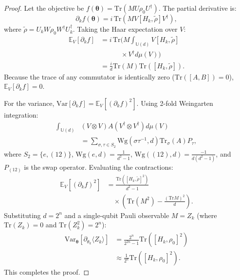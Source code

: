 \documentclass[pdflatex,sn-mathphys-num]{sn-jnl}%
\theoremstyle{thmstyleone}%
\theoremstyle{thmstyletwo}%
\theoremstyle{thmstylethree}%
\begin{document}
\begin{proof}
Let the objective be $f(\boldsymbol{\theta}) = \mathrm{Tr}(M U \rho_0 U^\dagger)$. The partial derivative is:
\begin{equation}
\partial_k f(\boldsymbol{\theta}) = i \, \mathrm{Tr}\left( M V [H_k, \tilde{\rho}] V^\dagger \right),
\end{equation}
where $\tilde{\rho} = U_k W \rho_0 W^\dagger U_k^\dagger$. Taking the Haar expectation over $V$:
\begin{align}
\mathbb{E}_V [\partial_k f] &= i \, \mathrm{Tr}\bigg( M \int_{\mathbb{U}(d)} V [H_k, \tilde{\rho}] \nonumber \\
&\qquad\quad \times V^\dagger d\mu(V) \bigg) \nonumber \\
&= \frac{i}{d} \mathrm{Tr}(M) \mathrm{Tr}([H_k, \tilde{\rho}]).
\label{eq:haar_expectation_zero}
\end{align}
Because the trace of any commutator is identically zero ($\mathrm{Tr}([A, B]) = 0$), $\mathbb{E}_V [\partial_k f] = 0$.

For the variance, $\mathrm{Var}[\partial_k f] = \mathbb{E}_V [(\partial_k f)^2]$. Using 2-fold Weingarten integration:
\begin{align}
\int_{\mathbb{U}(d)} &(V \otimes V) A (V^\dagger \otimes V^\dagger) d\mu(V) \nonumber \\
&= \sum_{\sigma, \tau \in S_2} \mathrm{Wg}(\sigma\tau^{-1}, d) \mathrm{Tr}_\sigma(A) P_\tau,
\label{eq:weingarten_formula}
\end{align}
where $S_2 = \{e, (12)\}$, $\mathrm{Wg}(e, d) = \frac{1}{d^2 - 1}$, $\mathrm{Wg}((12), d) = \frac{-1}{d(d^2 - 1)}$, and $P_{(12)}$ is the swap operator. Evaluating the contractions:
\begin{align}
\mathbb{E}_V [(\partial_k f)^2] &= \frac{\mathrm{Tr}\left([H_k, \tilde{\rho}]^2\right)}{d^2 - 1} \nonumber \\
&\quad \times \left( \mathrm{Tr}(M^2) - \frac{(\mathrm{Tr} M)^2}{d} \right).
\end{align}
Substituting $d = 2^n$ and a single-qubit Pauli observable $M = Z_k$ (where $\mathrm{Tr}(Z_k) = 0$ and $\mathrm{Tr}(Z_k^2) = 2^n$):
\begin{align}
\mathrm{Var}_{\boldsymbol{\theta}}[\partial_{\theta_k} \langle Z_k \rangle] &= \frac{2^n}{2^{2n} - 1} \mathrm{Tr}([H_k, \rho_0]^2) \nonumber \\
&\approx \frac{1}{2^n} \mathrm{Tr}([H_k, \rho_0]^2).
\label{eq:variance_decay_proof}
\end{align}
This completes the proof.
\end{proof}
\end{document}
